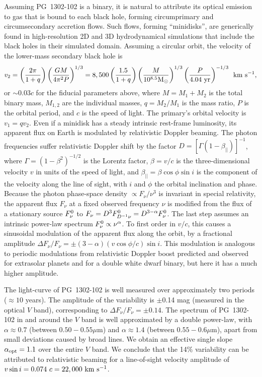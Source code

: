 Assuming PG~1302-102 is a binary, it is natural to attribute its
optical emission to gas that is bound to each black hole, forming
circumprimary and circumsecondary accretion flows. Such flows, forming
``minidisks'', are generically found in high-resolution 2D and 3D
hydrodynamical simulations that include the black holes in their
simulated
domain\cite{Hayasaki+2008,ShiKrolik:2012,Roedig:2012:Trqs,DHM:2013:MNRAS,Nixon+2013,Farris:2014,Dunhill+2015,ShiKrolik:2015}.
Assuming a circular orbit, the velocity of the lower-mass secondary
black hole is
\begin{equation}
\nonumber
v_2= \left(\frac{2\pi}{1+q}\right) \left(\frac{GM}{4\pi^2P}\right)^{1/3} 
=8,500 
\left(\frac{1.5}{1+q}\right) 
\left(\frac{M}{10^{8.5}{\rm M_\odot}}\right)^{1/3}
\left(\frac{P}{4.04~{\rm yr}}\right)^{-1/3} \,\,\, {\rm km~s^{-1}},
\end{equation}
or $\sim 0.03c$ for the fiducial parameters above, where $M=M_1+M_2$
is the total binary mass, $M_{1,2}$ are the individual masses,
$q=M_2/M_1$ is the mass ratio, $P$ is the orbital period, and $c$ is
the speed of light.  The primary's orbital velocity is $v_1=qv_2$.
Even if a minidisk has a steady intrinsic rest-frame luminosity, its
apparent flux on Earth is modulated by relativistic Doppler beaming.
The photon frequencies suffer relativistic Doppler shift by the factor
$D=[\Gamma(1-\beta_{||})]^{-1}$, where $\Gamma=(1-\beta^2)^{-1/2}$ is
the Lorentz factor, $\beta=v/c$ is the three-dimensional velocity $v$
in units of the speed of light, and $\beta_{||}=\beta\cos\phi\sin i$
is the component of the velocity along the line of sight, with $i$ and
$\phi$ the orbital inclination and phase.  Because the photon
phase-space density $\propto F_\nu / \nu^3$ is invariant in special
relativity, the apparent flux $F_\nu$ at a fixed observed frequency
$\nu$ is modified from the flux of a stationary source $F_\nu^{\rm 0}$
to $F_\nu =D^{3}F^{\rm 0}_{D^{-1}\nu}=D^{3-\alpha}F^{\rm 0}_{\nu}$.
The last step assumes an intrinsic power-law spectrum $F^{\rm
  0}_{\nu}\propto \nu^{\alpha}$.  To first order in $v/c$, this causes
a sinusoidal modulation of the apparent flux along the orbit, by a
fractional amplitude $\Delta F_\nu/F_\nu = \pm
(3-\alpha)(v\cos\phi/c)\sin i$.  This modulation is analogous to
periodic modulations from relativistic Doppler boost
predicted\cite{LoebGaudi2003} and observed for extrasolar
planets\cite{Kerkwijk+2010,MH2010} and for a double white dwarf
binary\cite{Shporer+2010}, but here it has a much higher amplitude.


The light-curve of PG~1302-102 is well measured over approximately two
periods ($\approx 10$ years).  The amplitude of the variability is
$\pm$0.14 mag (measured in the optical $V$
band\cite{Djorgovski+2010}), corresponding to $\Delta
F_\nu/F_\nu=\pm0.14$.  The spectrum of PG~1302-102 in and around the
$V$ band is well approximated by a double power-law, with
$\alpha\approx 0.7$ (between $0.50-0.55\mu$m) and $\alpha\approx 1.4$
(between $0.55-0.6\mu$m), apart from small deviations caused by broad
lines.  We obtain an effective single slope $\alpha_{\rm opt}=1.1$
over the entire $V$ band.  We conclude that the 14\% variability can
be attributed to relativistic beaming for a line-of-sight velocity
amplitude of $v\sin i=0.074~c=22,000~{\rm km~s^{-1}}$.

